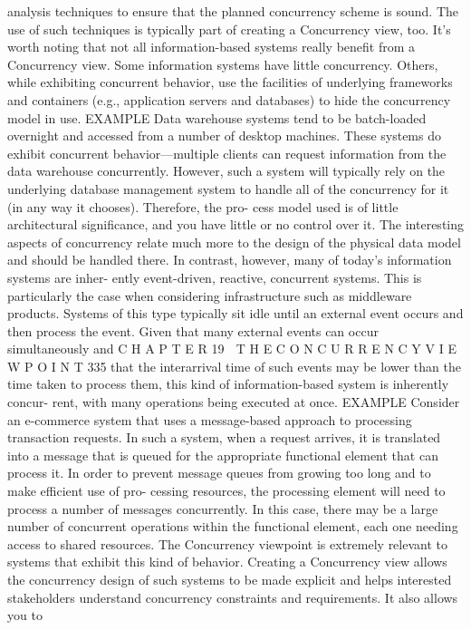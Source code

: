 analysis techniques to ensure that the planned concurrency scheme is sound.
The use of such techniques is typically part of creating a Concurrency view, too.
It’s worth noting that not all information-based systems really benefit
from a Concurrency view. Some information systems have little concurrency.
Others, while exhibiting concurrent behavior, use the facilities of underlying
frameworks and containers (e.g., application servers and databases) to hide
the concurrency model in use.
EXAMPLE Data warehouse systems tend to be batch-loaded overnight
and accessed from a number of desktop machines. These systems do
exhibit concurrent behavior—multiple clients can request information
from the data warehouse concurrently. However, such a system will
typically rely on the underlying database management system to handle
all of the concurrency for it (in any way it chooses). Therefore, the pro-
cess model used is of little architectural significance, and you have little
or no control over it. The interesting aspects of concurrency relate much
more to the design of the physical data model and should be handled
there.
In contrast, however, many of today’s information systems are inher-
ently event-driven, reactive, concurrent systems. This is particularly the
case when considering infrastructure such as middleware products. Systems
of this type typically sit idle until an external event occurs and then process
the event. Given that many external events can occur simultaneously and
C H A P T E R 19  T H E C O N C U R R E N C Y V I E W P O I N T
 335
that the interarrival time of such events may be lower than the time taken to
process them, this kind of information-based system is inherently concur-
rent, with many operations being executed at once.
EXAMPLE Consider an e-commerce system that uses a message-based
approach to processing transaction requests. In such a system, when a
request arrives, it is translated into a message that is queued for the
appropriate functional element that can process it. In order to prevent
message queues from growing too long and to make efficient use of pro-
cessing resources, the processing element will need to process a number
of messages concurrently. In this case, there may be a large number of
concurrent operations within the functional element, each one needing
access to shared resources.
The Concurrency viewpoint is extremely relevant to systems that exhibit
this kind of behavior. Creating a Concurrency view allows the concurrency
design of such systems to be made explicit and helps interested stakeholders
understand concurrency constraints and requirements. It also allows you to
